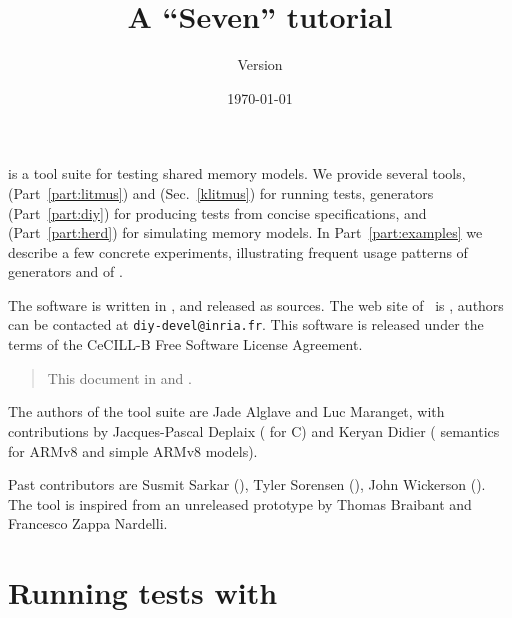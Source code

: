 \documentclass{article}
\title{A \prog{diy} ``Seven'' tutorial}
\author{Version \version}
\date{\today}
\begin{document}
\maketitle

\diy{} is a tool suite for testing shared memory models.  We
provide several tools, \litmus{} (Part~\ref{part:litmus})
and \klitmus{} (Sec.~\ref{klitmus}) for running tests,
\diy{} generators (Part~\ref{part:diy}) for producing tests from concise
specifications, and
\herd{} (Part~\ref{part:herd}) for simulating memory models.
In Part~\ref{part:examples} we describe
a few concrete experiments, illustrating frequent usage patterns of
\diy{} generators and of \litmus.


The software is written in
, and released as
sources.  The web site of~\diy{} is
, authors can be contacted at
\texttt{diy-devel@inria.fr}.
This software is released under the terms of the CeCILL-B Free Software License
Agreement.



\begin{htmlonly}
\begin{quote}
This document in  and .
\end{quote}
\end{htmlonly}

The authors of the \diy{} tool suite are Jade Alglave and Luc Maranget,
with contributions by Jacques-Pascal Deplaix (\litmus{} for C) and
Keryan Didier (\herd{} semantics for ARMv8 and simple ARMv8 models).

Past contributors are Susmit Sarkar (),
Tyler Sorensen (), John Wickerson ().
The tool  is inspired from an unreleased prototype by
Thomas Braibant and Francesco Zappa Nardelli.

\tableofcontents
\cutend

\clearpage
\part{Running\label{part:litmus} tests with \litmus}

\end{document}
